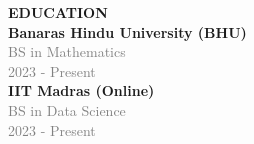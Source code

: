 \documentclass[a4paper,10pt]{article}
\begin{document}
\begin{minipage}[t]{7cm}
\begin{minipage}{5.4cm}
        \vspace{0.6cm}
        \large \textbf{EDUCATION} \\
        \normalsize
        \vspace{0.1cm}
        \textbf{Banaras Hindu University (BHU)}\\
        \textcolor{GrayText}{BS in Mathematics}\\
        \textcolor{GrayText}{2023 - Present}\\[0.2cm]
        \textbf{IIT Madras (Online)}\\
        \textcolor{GrayText}{BS in Data Science}\\
        \textcolor{GrayText}{2023 - Present}
    \end{minipage}
\end{minipage}%
\hspace*{0.6cm}%
\end{document}

